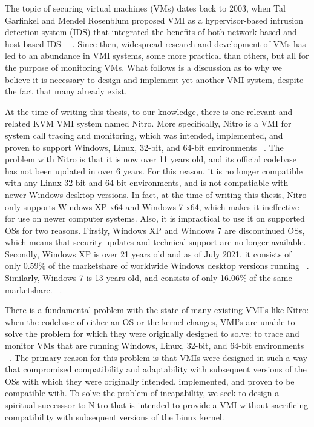 \documentclass{report}
\begin{document}
\begin{spacing}{1.5}
{\large
The topic of securing virtual machines (VMs) dates back to 2003, when Tal Garfinkel and Mendel Rosenblum proposed VMI as a hypervisor-based intrusion detection system (IDS) that integrated the benefits of both network-based and host-based IDS ~\cite{hebbal2015virtual}~\cite{somayaji2002operating}. Since then, widespread research and development of VMs has led to an abundance in VMI systems, some more practical than others, but all for the purpose of monitoring VMs. What follows is a discussion as to why we believe it is necessary to design and implement yet another VMI system, despite the fact that many already exist.
\newline
}


{\large
\noindent At the time of writing this thesis, to our knowledge, there is one relevant and related KVM VMI system named Nitro. More specifically, Nitro is a VMI for system call tracing and monitoring, which was intended, implemented, and proven to support Windows, Linux, 32-bit, and 64-bit environments ~\cite{10.1007/978-3-642-25141-2_7}. The problem with Nitro is that it is now over 11 years old, and its official codebase has not been updated in over 6 years. For this reason, it is no longer compatible with any Linux 32-bit and 64-bit environments, and is not compatiable with newer Windows desktop versions. In fact, at the time of writing this thesis, Nitro only supports Windows XP x64 and Windows 7 x64, which makes it ineffective for use on newer computer systems. Also, it is impractical to use it on supported OSs for two reasons. Firstly, Windows XP and Windows 7 are discontinued OSs, which means that security updates and technical support are no longer available. Secondly, Windows XP is over 21 years old and as of July 2021, it consists of only 0.59\% of the marketshare of worldwide Windows desktop versions running ~\cite{luo2022teaching}. Similarly, Windows 7 is 13 years old, and consists of only 16.06\% of the same marketshare. ~\cite{luo2022teaching}.
\newline
}

{\large
\noindent There is a fundamental problem with the state of many existing VMI's like Nitro: when the codebase of either an OS or the kernel changes, VMI's are unable to solve the problem for which they were originally designed to solve: to trace and monitor VMs that are running Windows, Linux, 32-bit, and 64-bit environments ~\cite{win2014virtual}. The primary reason for this problem is that VMIs were designed in such a way that compromised compatibility and adaptability with subsequent versions of the OSs with which they were originally intended, implemented, and proven to be compatible with. To solve the problem of incapability, we seek to design a spiritual successsor to Nitro that is intended to provide a VMI without sacrificing compatibility with subsequent versions of the Linux kernel.
\newline
}










\end{spacing}
\end{document}
